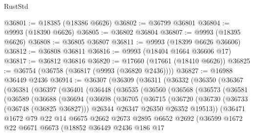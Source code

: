 \begin{lexlean}{RustStd}
\begin{coremodule}
@36801 := @18385 (@18386 @6626)
@36802 := @36799 @36801
@36804 := @9993 (@18390 @6626)
@36805 := @36802 @36804
@36807 := @9993 (@18395 @6626)
@36808 := @36805 @36807
@36811 := @9993 (@18399 @6626 @36606)
@36812 := @36808 @36811
@36816 := @9993 (@18404 @1664 @36606 @17)
@36817 := @36812 @36816
@36820 := @17660 (@17661 (@18410 @6626))
@36825 := @36754 (@36758 (@36817 (@9993 (@36820 @2436))))
@36827 := @16988 @36449 @2436
@36914 := @36307
    (@36309
      (@36311
        (@36332
          (@36350
            (@36367
              (@36381
                (@36397
                  (@36401
                    (@36448
                      (@36535
                        (@36560
                          (@36568
                            (@36573
                              (@36581
                                (@36589
                                  (@36688
                                    (@36694
                                      (@36698
                                        (@36705
                                          (@36715
                                            (@36720
                                              (@36730
                                                (@36733 (@36748 (@36825 @36827)))
                                                @26344
                                                @26347
                                                @26350
                                                @26352
                                                @19513))
                                            (@36471
                                              @1672
                                              @79
                                              @22
                                              @14
                                              @6675
                                              @2662
                                              @2673
                                              @2895
                                              @6652
                                              @2692
                                              (@36599
                                                @1672
                                                @22
                                                @6671
                                                @6673
                                                (@18852
                                                  @36449
                                                  @2436
                                                  @186
                                                  @17

\end{coremodule}
\end{lexlean}
